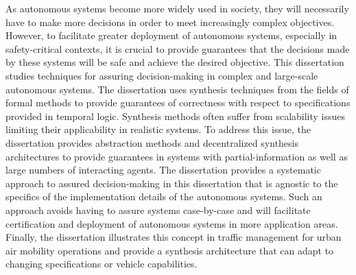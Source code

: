 \documentclass[12pt,twosided,openright]{report}	%
\theoremstyle{definition}
\theoremstyle{remark}
\begin{document}
As autonomous systems become more widely used in society, they will necessarily have to make more decisions in order to meet increasingly complex objectives. However, to facilitate greater deployment of autonomous systems, especially in safety-critical contexts, it is crucial to provide guarantees that the decisions made by these systems will be safe and achieve the desired objective. This dissertation studies techniques for assuring decision-making in complex and large-scale autonomous systems. The dissertation uses synthesis techniques from the fields of formal methods to provide guarantees of correctness with respect to specifications provided in temporal logic. Synthesis methods often suffer from scalability issues limiting their applicability in realistic systems. To address this issue, the dissertation provides abstraction methods and decentralized synthesis architectures to provide guarantees in systems with partial-information as well as large numbers of interacting agents. The dissertation provides a systematic approach to assured decision-making in this dissertation that is agnostic to the specifics of the implementation details of the autonomous systems. Such an approach avoids having to assure systems case-by-case and will facilitate certification and deployment of autonomous systems in more application areas. Finally, the dissertation illustrates this concept in traffic management for urban air mobility operations and provide a synthesis architecture that can adapt to changing specifications or vehicle capabilities. 

\tableofcontents   %

\listoftables      %
\listoffigures     %



%
%
\end{document}
